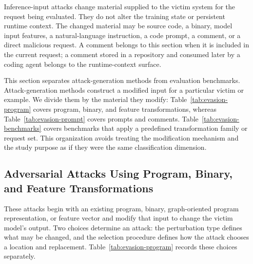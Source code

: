 \documentclass[acmsmall,screen,review]{acmart}
\begin{document}
Inference-input attacks change material supplied to the victim system for the request being evaluated. They do not alter the training state or persistent runtime context. The changed material may be source code, a binary, model input features, a natural-language instruction, a code prompt, a comment, or a direct malicious request. A comment belongs to this section when it is included in the current request; a comment stored in a repository and consumed later by a coding agent belongs to the runtime-context surface.

This section separates attack-generation methods from evaluation benchmarks. Attack-generation methods construct a modified input for a particular victim or example. We divide them by the material they modify: Table~\ref{tab:evasion-program} covers program, binary, and feature transformations, whereas Table~\ref{tab:evasion-prompt} covers prompts and comments. Table~\ref{tab:evasion-benchmarks} covers benchmarks that apply a predefined transformation family or request set. This organization avoids treating the modification mechanism and the study purpose as if they were the same classification dimension.

\subsection{Adversarial Attacks Using Program, Binary, and Feature Transformations}
\label{sec:evasion-program}

These attacks begin with an existing program, binary, graph-oriented program representation, or feature vector and modify that input to change the victim model's output. Two choices determine an attack: the perturbation type defines what may be changed, and the selection procedure defines how the attack chooses a location and replacement. Table~\ref{tab:evasion-program} records these choices separately.
\end{document}
